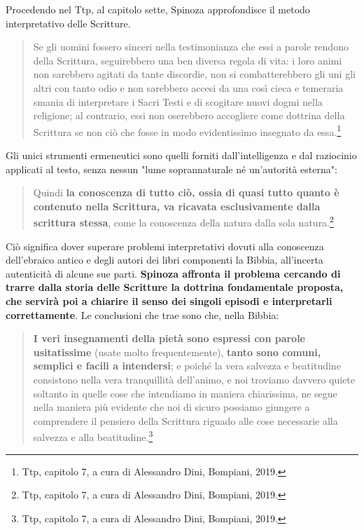 Procedendo nel Ttp, al capitolo sette, Spinoza approfondisce il metodo interpretativo delle Scritture. 

\begin{quotation}
	\small Se gli uomini fossero sinceri nella testimonianza che essi a parole rendono della
	Scrittura, seguirebbero una ben diversa regola di vita: i loro animi non sarebbero
	agitati da tante discordie, non si combatterebbero gli uni gli altri con tanto odio
	e non sarebbero accesi da una così cieca e temeraria smania di interpretare i Sacri
	Testi e di scogitare nuovi dogmi nella religione; al contrario, essi non oserebbero
	accogliere come dottrina della Scrittura se non ciò che fosse in modo evidentissimo
	insegnato da essa.\footnote{Ttp, capitolo 7, a cura di Alessandro Dini, Bompiani, 2019.}
\end{quotation}

Gli unici strumenti ermeneutici sono quelli forniti dall'intelligenza e dal raziocinio applicati al testo, senza nessun "lume soprannaturale né un’autorità esterna":

\begin{quotation}
	\small Quindi \textbf{la conoscenza di
	tutto ciò, ossia di quasi tutto quanto è contenuto nella Scrittura, va ricavata
	esclusivamente dalla scrittura stessa}, come la conoscenza della natura dalla sola
	natura.\footnote{Ttp, capitolo 7, a cura di Alessandro Dini, Bompiani, 2019.}
\end{quotation}

Ciò significa dover superare problemi interpretativi dovuti alla conoscenza dell'ebraico antico e degli autori dei libri componenti la Bibbia, all'incerta autenticità di alcune sue parti. \textbf{Spinoza affronta il problema cercando di trarre dalla storia delle Scritture la dottrina fondamentale proposta, che servirà poi a chiarire il senso dei singoli episodi e interpretarli correttamente}. Le conclusioni che trae sono che, nella Bibbia:

\begin{quotation}
	\small \textbf{I veri insegnamenti della pietà sono espressi con parole usitatissime} (usate molto frequentemente), \textbf{tanto sono comuni, semplici e facili a intendersi}; e poiché la vera salvezza e beatitudine consistono nella vera tranquillità dell'animo, e noi troviamo davvero quiete soltanto in quelle cose che intendiamo in maniera chiarissima, ne segue nella maniera più evidente che noi di sicuro possiamo giungere a comprendere il pensiero della Scrittura riguado alle cose necessarie alla salvezza e alla beatitudine.\footnote{Ttp, capitolo 7, a cura di Alessandro Dini, Bompiani, 2019.}
\end{quotation}

